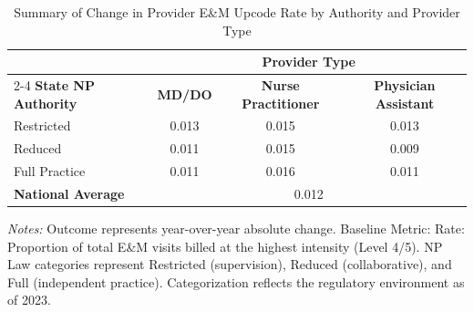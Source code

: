 \begin{table}[htbp]
    \centering
    \caption{Summary of Change in Provider E\&M Upcode Rate by Authority and Provider Type}
    \label{tab:d_partb_em_upcode_rate}
    \vspace{0.2cm}
    \begin{tabular}{lccc}
        \toprule
        & \multicolumn{3}{c}{\textbf{Provider Type}} \\
        \cmidrule(lr){2-4}
        \textbf{State NP Authority} & \textbf{MD/DO} & \textbf{Nurse Practitioner} & \textbf{Physician Assistant} \\
        \midrule
        Restricted & 0.013 & 0.015 & 0.013 \\
        Reduced & 0.011 & 0.015 & 0.009 \\
        Full Practice & 0.011 & 0.016 & 0.011 \\
        \midrule
        \textbf{National Average} & \multicolumn{3}{c}{0.012} \\
        \bottomrule
    \end{tabular}
    \vspace{0.1cm}
    \begin{minipage}{0.85\textwidth}
        \footnotesize \textit{Notes:} Outcome represents year-over-year absolute change. Baseline Metric: Rate: Proportion of total E\&M visits billed at the highest intensity (Level 4/5). NP Law categories represent Restricted (supervision), Reduced (collaborative), and Full (independent practice). Categorization reflects the regulatory environment as of 2023.
    \end{minipage}
\end{table}